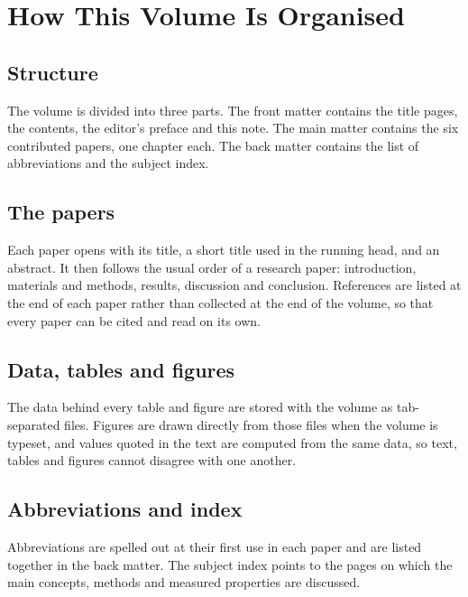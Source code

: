 \chapter{How This Volume Is Organised}

\section*{Structure}
The volume is divided into three parts. The front matter contains the title
pages, the contents, the editor's preface and this note. The main matter
contains the six contributed papers, one chapter each. The back matter
contains the list of abbreviations and the subject index.

\section*{The papers}
Each paper opens with its title, a short title used in the running head, and
an abstract. It then follows the usual order of a research paper:
introduction, materials and methods, results, discussion and conclusion.
References are listed at the end of each paper rather than collected at the
end of the volume, so that every paper can be cited and read on its own.

\section*{Data, tables and figures}
The data behind every table and figure are stored with the volume as
tab-separated files. Figures are drawn directly from those files when the
volume is typeset, and values quoted in the text are computed from the same
data, so text, tables and figures cannot disagree with one another.

\section*{Abbreviations and index}
Abbreviations are spelled out at their first use in each paper and are listed
together in the back matter. The subject index points to the pages on which
the main concepts, methods and measured properties are discussed.

